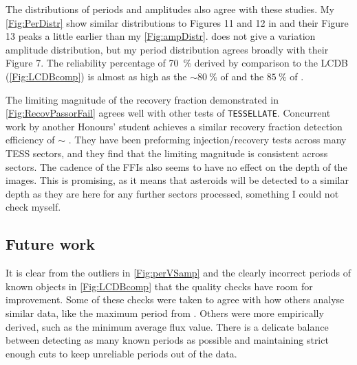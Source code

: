 \documentclass{UCreport}
\begin{document}
\begin{table}[!t]
  \centering
  \caption[TESS Literature Comparison Table]{The eight asteroids have rotation periods in this work rounded to two decimal places. Their periods as calculated by \citet{Pal2020} and \citet{McNeill2023} are also given. All periods are measured in hours (\unit{\hour})} \label{Tab:AllPers}
\end{table}

The distributions of periods and amplitudes also agree with these studies. 
My \autoref{Fig:PerDistr}  show similar distributions to Figures 11 and 12 in \citet{McNeill2023} and their Figure 13 peaks a little earlier than my \autoref{Fig:ampDistr}. 
\citet{Pal2020} does not give a variation amplitude distribution, but my period distribution agrees broadly with their Figure 7.
The reliability percentage of \qty{70}{\percent} derived by comparison to the LCDB (\autoref{Fig:LCDBcomp}) is almost as high as the $\sim \qty{80}{\percent}$ of \citeauthor{Pal2020} and the $\qty{85}{\percent}$ of \citeauthor{McNeill2023}.

The limiting magnitude of the recovery fraction demonstrated in \autoref{Fig:RecovPassorFail} agrees well with other tests of \texttt{TESSELLATE}.
Concurrent work by another Honours' student \citep{MontillaHons} achieves a similar recovery fraction detection efficiency of $\sim$ \unit{\mag}.
They have been preforming injection/recovery tests across many TESS sectors, and they find that the limiting magnitude is consistent across sectors.
The cadence of the FFIs also seems to have no effect on the depth of the images.
This is promising, as it means that asteroids will be detected to a similar depth as they are here for any further sectors processed, something I could not check myself.

\subsection{Future work}
It is clear from the outliers in \autoref{Fig:perVSamp} and the clearly incorrect periods of known objects in \autoref{Fig:LCDBcomp} that the quality checks have room for improvement.
Some of these checks were  taken to agree with how others analyse similar data, like the maximum period from \citet{McNeill2023}.
Others were more empirically derived, such as the minimum average flux value.
There is a delicate balance between detecting as many known periods as possible and maintaining strict enough cuts to keep unreliable periods out of the data.
\end{document}
